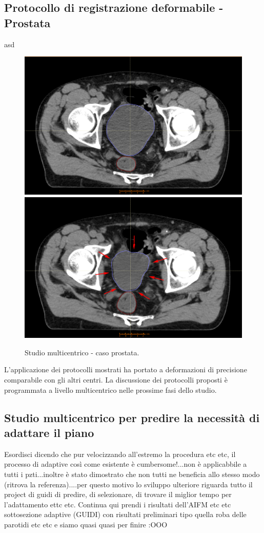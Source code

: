 \subsection{Protocollo di registrazione deformabile - Prostata}
asd
\begin{figure}
\centering
\includegraphics[width=.48\textwidth]{./cap3/YES_PR.png}
\includegraphics[width=.48\textwidth]{./cap3/YES_PR_shrink.png}
\caption{Studio multicentrico - caso prostata.}
\label{fig:YES_PR}
\end{figure}


L'applicazione dei protocolli mostrati ha portato a deformazioni di precisione comparabile con gli altri centri. La discussione dei protocolli proposti è programmata a livello multicentrico nelle prossime fasi dello studio.


\subsection{Studio multicentrico per predire la necessità di adattare il piano}
Esordisci dicendo che pur velocizzando all'estremo la procedura etc etc, il processo di adaptive così come esistente è cumbersome!...non è applicabbile a tutti i pzti...inoltre è stato dimostrato che non tutti ne beneficia allo stesso modo (ritrova la referenza)....per questo motivo lo sviluppo ulteriore riguarda tutto il project di guidi di predire, di selezionare, di trovare il miglior tempo per l'adattamento ettc etc.
Continua qui prendi i risultati dell'AIFM etc etc
sottosezione adaptive (GUIDI) con risultati preliminari tipo quella roba delle parotidi etc etc e siamo quasi quasi per finire :OOO









